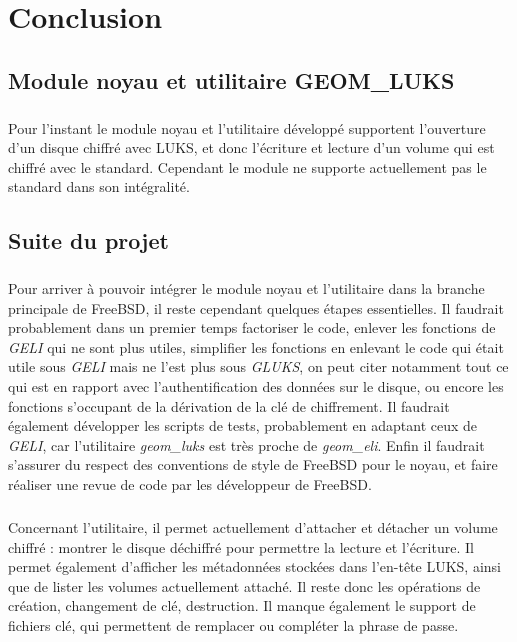\chapter{Conclusion}
\section{Module noyau et utilitaire GEOM\_LUKS}

\paragraph{}
Pour l'instant le module noyau et l'utilitaire développé supportent l'ouverture
d'un disque chiffré avec LUKS, et donc l'écriture et lecture d'un volume qui est
chiffré avec le standard. Cependant le module ne supporte actuellement pas le
standard dans son intégralité.


\section{Suite du projet}
\paragraph{}
Pour arriver à pouvoir intégrer le module noyau et l'utilitaire dans la branche
principale de FreeBSD, il reste cependant quelques étapes essentielles. Il
faudrait probablement dans un premier temps factoriser le code, enlever les
fonctions de {\em GELI} qui ne sont plus utiles, simplifier les fonctions en
enlevant le code qui était utile sous {\em GELI} mais ne l'est plus sous
{\em GLUKS}, on peut citer notamment tout ce qui est en rapport avec
l'authentification des données sur le disque, ou encore les fonctions s'occupant de la dérivation de la
clé de chiffrement. Il faudrait également développer les scripts de tests, 
probablement en adaptant ceux de {\em GELI}, car l'utilitaire {\em geom\_luks} est
très proche de {\em geom\_eli}. Enfin il faudrait s'assurer du respect des
conventions de style de FreeBSD pour le noyau, et faire réaliser une revue de
code par les développeur de FreeBSD.

\paragraph{}
Concernant l'utilitaire, il permet actuellement d'attacher et détacher un volume chiffré :
montrer le disque déchiffré pour permettre la lecture et l'écriture. Il permet
également d'afficher les métadonnées stockées dans l'en-tête LUKS, ainsi que de
lister les volumes actuellement attaché. Il reste donc les opérations de
création, changement de clé, destruction. Il manque également le support de 
fichiers clé, qui permettent de remplacer ou compléter la phrase de passe.

